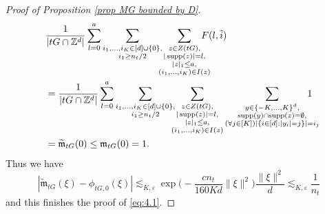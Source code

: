 \documentclass[a4paper,oneside, reqno]{amsart}
\numberwithin{equation}{section}
\theoremstyle{definition}%
\theoremstyle{definition}
\theoremstyle{definition}%
\theoremstyle{definition}
\newcommand{\Z}{\mathbb{Z}}
\DeclareMathOperator{\supp}{supp}
\begin{document}
\begin{proof}[Proof of Proposition \ref{prop MG bounded by D}]
\begin{align*}
&\frac{1}{|tG \cap \Z^d|} \sum_{l=0}^a \hspace{-0cm}\sum_{\substack{i_1,...,i_K \in [d] \cup \{0\}, 
\\ 
i_1 \geq n_t/2
}} \hspace{-0.2cm} \sum_{\substack{z \in Z(tG),
\\ |\supp(z)|=l, \\ |z|_1 \le a, \\ (i_1,\ldots,i_K) \in I(z)
}}  \hspace{-0.4cm} F(l, \overline{i})
\\
&=\frac{1}{|tG \cap \Z^d|} \sum_{l=0}^a \hspace{-0cm}\sum_{\substack{i_1,...,i_K \in [d] \cup \{0\}, 
\\ 
i_1 \geq n_t/2
}} \hspace{-0.2cm} \sum_{\substack{z \in Z(tG),
\\ |\supp(z)|=l, \\ |z|_1 \le a, \\ (i_1,\ldots,i_K) \in I(z)
}} 
\sum_{\substack{y \in \{-K,...,K\}^d, 
\\ \supp(y) \cap \supp(z)= \emptyset, 
\\
(\forall j \in [K]) |\{i \in [d]: |y_i|=j\}|=i_j
}} \hspace{-0.5cm} 1 \\
&= \widetilde{\mathfrak{m}}_{tG}(0) \leq \mathfrak{m}_{tG}(0)=1.
\end{align*}
Thus we have
\[
|\widetilde{\mathfrak{m}}_{tG}(\xi)-\phi_{tG,0}(\xi)| \lesssim_{K,\varepsilon} \exp\Big( -\frac{cn_t}{160Kd} \| \xi \|^2 \Big)  \frac{ \| \xi \|^2}{d} \lesssim_{K,\varepsilon} \frac{1}{n_t}
\]
and this finishes the proof of \eqref{eq:4.1}.


\end{proof}
\end{document}

